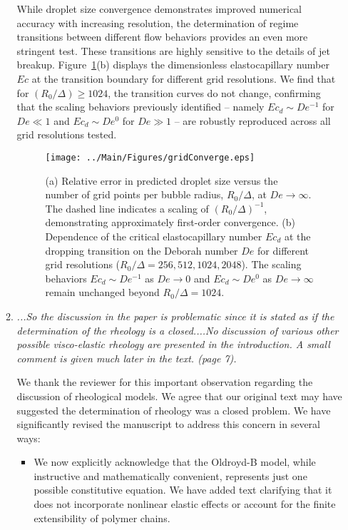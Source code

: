 \documentclass[]{article}
\newcommand{\sos}[1]{\todo[color=red, bordercolor=none, textcolor=white]{SOS}\textcolor{red}{#1}}
\newcommand{\bb}{\color{black} \normalfont}
\begin{document}
\begin{enumerate}
\begin{enumerate}
While droplet size convergence demonstrates improved numerical accuracy with increasing resolution, the determination of regime transitions between different flow behaviors provides an even more stringent test. These transitions are highly sensitive to the details of jet breakup. Figure~\ref{fig:gis}(b) displays the dimensionless elastocapillary number $Ec$ at the transition boundary for different grid resolutions. We find that for $(R_0/\Delta) \geq 1024$, the transition curves do not change, confirming that the scaling behaviors previously identified -- namely $Ec_d \sim De^{-1}$ for $De \ll 1$ and $Ec_d \sim De^0$ for $De \gg 1$ -- are robustly reproduced across all grid resolutions tested.

\begin{figure}
	\centering
	\texttt{[image: ../Main/Figures/gridConverge.eps]}
	\caption{(a) Relative error in predicted droplet size versus the number of grid points per bubble radius, $R_0/\Delta$, at $De \to \infty$. The dashed line indicates a scaling of $(R_0/\Delta)^{-1}$, demonstrating approximately first-order convergence. (b) Dependence of the critical elastocapillary number $Ec_d$ at the dropping transition on the Deborah number $De$ for different grid resolutions ($R_0/\Delta = 256, 512, 1024, 2048$). The scaling behaviors $Ec_d \sim De^{-1}$ as $De \to 0$ and $Ec_d \sim De^0$ as $De \to \infty$ remain unchanged beyond $R_0/\Delta = 1024$.}
	\label{fig:gis}
\end{figure}

\bb


        \item \textit{...So the discussion in the paper is problematic since it is stated as if the determination of the rheology is a closed....No discussion of various other possible visco-elastic rheology are presented in the introduction. A small comment is given much later in the text. (page 7).}
        
        We thank the reviewer for this important observation regarding the discussion of rheological models. We agree that our original text may have suggested the determination of rheology was a closed problem. We have significantly revised the manuscript to address this concern in several ways:

        \begin{itemize}
            \item We now explicitly acknowledge that the Oldroyd-B model, while instructive and mathematically convenient, represents just one possible constitutive equation. We have added text clarifying that it does not incorporate nonlinear elastic effects or account for the finite extensibility of polymer chains.
        

\end{itemize}
\end{enumerate}
\end{enumerate}
\end{document}
